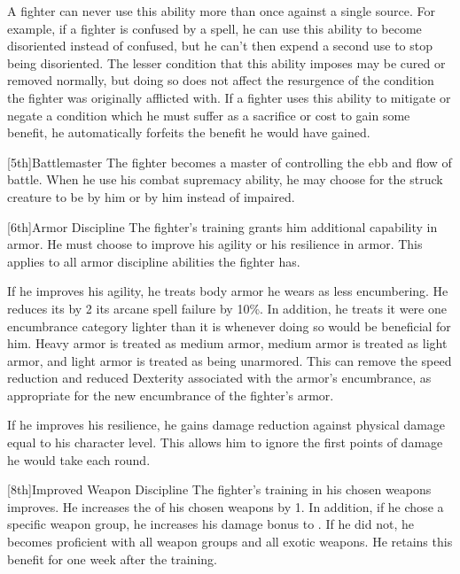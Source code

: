         \par A fighter can never use this ability more than once against a single source.
        For example, if a fighter is confused by a  spell, he can use this ability to become disoriented instead of confused, but he can't then expend a second use to stop being disoriented.
        The lesser condition that this ability imposes may be cured or removed normally, but doing so does not affect the resurgence of the condition the fighter was originally afflicted with.
        If a fighter uses this ability to mitigate or negate a condition which he must suffer as a sacrifice or cost to gain some benefit, he automatically forfeits the benefit he would have gained.

        [5th]{Battlemaster}
        The fighter becomes a master of controlling the ebb and flow of battle.
        When he use his combat supremacy ability, he may choose for the struck creature to be \goaded by him or \shaken by him instead of impaired.

        [6th]{Armor Discipline}
        The fighter's training grants him additional capability in armor.
        He must choose to improve his agility or his resilience in armor.
        This applies to all armor discipline abilities the fighter has.

        If he improves his agility, he treats body armor he wears as less encumbering.
        He reduces its  by 2 its arcane spell failure by 10\%.
        In addition, he treats it were one encumbrance category lighter than it is whenever doing so would be beneficial for him.
        Heavy armor is treated as medium armor, medium armor is treated as light armor, and light armor is treated as being unarmored.
        This can remove the speed reduction and reduced Dexterity associated with the armor's encumbrance, as appropriate for the new encumbrance of the fighter's armor.

        If he improves his resilience, he gains damage reduction against physical damage equal to his character level. This allows him to ignore the first points of damage he would take each round.

        [8th]{Improved Weapon Discipline}
        The fighter's training in his chosen weapons improves.
        He increases the  of his chosen weapons by 1.
        In addition, if he chose a specific weapon group, he increases his damage bonus to .
        If he did not, he becomes proficient with all weapon groups and all exotic weapons.
        He retains this benefit for one week after the training.

